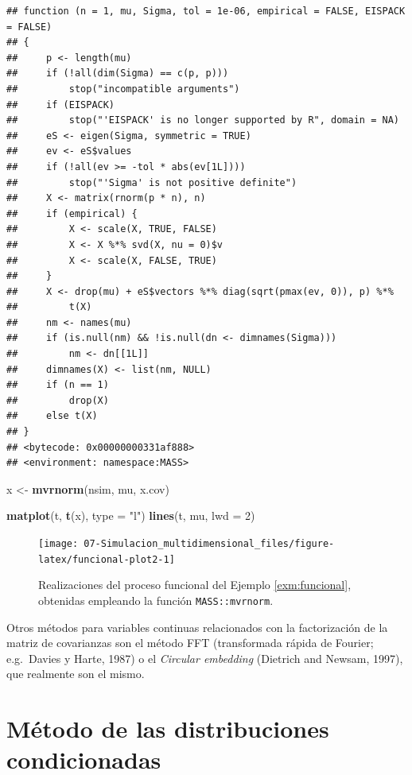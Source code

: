 \documentclass[
]{book}
\newenvironment{Shaded}{\begin{snugshade}}{\end{snugshade}}
\newcommand{\DataTypeTok}[1]{\textcolor[rgb]{0.13,0.29,0.53}{#1}}
\newcommand{\DecValTok}[1]{\textcolor[rgb]{0.00,0.00,0.81}{#1}}
\newcommand{\KeywordTok}[1]{\textcolor[rgb]{0.13,0.29,0.53}{\textbf{#1}}}
\newcommand{\NormalTok}[1]{#1}
\newcommand{\StringTok}[1]{\textcolor[rgb]{0.31,0.60,0.02}{#1}}
\theoremstyle{break}
\theoremstyle{definition}
\theoremstyle{definition}
\theoremstyle{definition}
\theoremstyle{remark}
\begin{document}
\begin{verbatim}
## function (n = 1, mu, Sigma, tol = 1e-06, empirical = FALSE, EISPACK = FALSE) 
## {
##     p <- length(mu)
##     if (!all(dim(Sigma) == c(p, p))) 
##         stop("incompatible arguments")
##     if (EISPACK) 
##         stop("'EISPACK' is no longer supported by R", domain = NA)
##     eS <- eigen(Sigma, symmetric = TRUE)
##     ev <- eS$values
##     if (!all(ev >= -tol * abs(ev[1L]))) 
##         stop("'Sigma' is not positive definite")
##     X <- matrix(rnorm(p * n), n)
##     if (empirical) {
##         X <- scale(X, TRUE, FALSE)
##         X <- X %*% svd(X, nu = 0)$v
##         X <- scale(X, FALSE, TRUE)
##     }
##     X <- drop(mu) + eS$vectors %*% diag(sqrt(pmax(ev, 0)), p) %*% 
##         t(X)
##     nm <- names(mu)
##     if (is.null(nm) && !is.null(dn <- dimnames(Sigma))) 
##         nm <- dn[[1L]]
##     dimnames(X) <- list(nm, NULL)
##     if (n == 1) 
##         drop(X)
##     else t(X)
## }
## <bytecode: 0x00000000331af888>
## <environment: namespace:MASS>
\end{verbatim}

\begin{Shaded}
\begin{Highlighting}[]
\NormalTok{x <-}\StringTok{ }\KeywordTok{mvrnorm}\NormalTok{(nsim, mu, x.cov)}

\KeywordTok{matplot}\NormalTok{(t, }\KeywordTok{t}\NormalTok{(x), }\DataTypeTok{type =} \StringTok{"l"}\NormalTok{)}
\KeywordTok{lines}\NormalTok{(t, mu, }\DataTypeTok{lwd =} \DecValTok{2}\NormalTok{)}
\end{Highlighting}
\end{Shaded}

\begin{figure}[!htb]

{\centering \texttt{[image: 07-Simulacion\_multidimensional\_files/figure-latex/funcional-plot2-1]} 

}

\caption{Realizaciones del proceso funcional del Ejemplo \ref{exm:funcional}, obtenidas empleando la función \texttt{MASS::mvrnorm}.}\label{fig:funcional-plot2}
\end{figure}

Otros métodos para variables continuas relacionados con la factorización de la matriz de covarianzas son el método FFT (transformada rápida de Fourier; e.g.~Davies y Harte, 1987) o el \emph{Circular embedding} (Dietrich and Newsam, 1997), que realmente son el mismo.

\hypertarget{distrcond}{%
\section{Método de las distribuciones condicionadas}\label{distrcond}}
\end{document}
